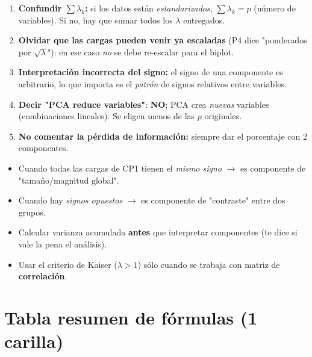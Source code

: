 \documentclass[11pt,a4paper]{article}
\begin{document}
\begin{tipbox}
\begin{enumerate}[leftmargin=*]
    \item \textbf{Confundir $\sum \lambda_k$:} si los datos están \emph{estandarizados}, $\sum \lambda_k = p$ (número de variables). Si no, hay que sumar todos los $\lambda$ entregados.
    \item \textbf{Olvidar que las cargas pueden venir ya escaladas} (P4 dice "ponderados por $\sqrt{\lambda}$"): en ese caso \emph{no} se debe re-escalar para el biplot.
    \item \textbf{Interpretación incorrecta del signo:} el signo de una componente es arbitrario, lo que importa es el \emph{patrón} de signos relativos entre variables.
    \item \textbf{Decir "PCA reduce variables"}: \textbf{NO}; PCA crea \emph{nuevas} variables (combinaciones lineales). Se eligen menos de las $p$ originales.
    \item \textbf{No comentar la pérdida de información:} siempre dar el porcentaje con 2 componentes.
\end{enumerate}
\end{tipbox}

\begin{tipbox}
\begin{itemize}[leftmargin=*]
    \item Cuando todas las cargas de CP1 tienen el \emph{mismo signo} $\to$ es componente de "tamaño/magnitud global".
    \item Cuando hay \emph{signos opuestos} $\to$ es componente de "contraste" entre dos grupos.
    \item Calcular varianza acumulada \textbf{antes} que interpretar componentes (te dice si vale la pena el análisis).
    \item Usar el criterio de Kaiser ($\lambda > 1$) sólo cuando se trabaja con matriz de \textbf{correlación}.
\end{itemize}
\end{tipbox}

\section{Tabla resumen de fórmulas (1 carilla)}
\end{document}
